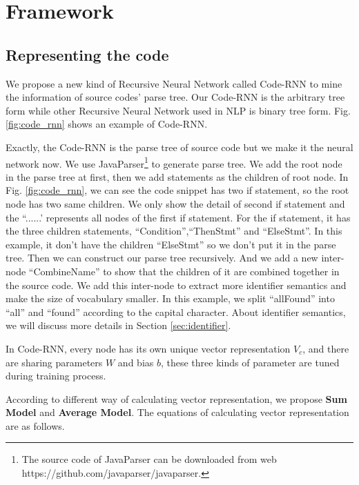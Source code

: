 \section{Framework}

\subsection{Representing the code}

We propose a new kind of Recursive Neural Network called Code-RNN to mine the information of source codes' parse tree. Our Code-RNN is the arbitrary tree form while other Recursive Neural Network used in NLP is binary tree form. Fig. \ref{fig:code_rnn} shows an example of Code-RNN.

Exactly, the Code-RNN is the parse tree of source code but we make it the neural network now. We use JavaParser\footnote{The source code of JavaParser can be downloaded from web https://github.com/javaparser/javaparser.} to generate parse tree. We add the root node in the parse tree at first, then we add statements as the children of root node. In Fig. \ref{fig:code_rnn}, we can see the code snippet has two if statement, so the root node has two same children. We only show the detail of second if statement and the ``......' represents all nodes of the first if statement. For the if statement, it has the three children statements, ``Condition'',``ThenStmt'' and ``ElseStmt''. In this example, it don't have the children ``ElseStmt'' so we don't put it in the parse tree. Then we can construct our parse tree recursively. And we add a new inter-node ``CombineName'' to show that the children of it are combined together in the source code. We add this inter-node to extract more identifier semantics and make the size of vocabulary smaller. In this example, we split ``allFound'' into ``all'' and ``found'' according to the capital character. About identifier semantics, we will discuss more details in Section \ref{sec:identifier}.

In Code-RNN, every node has its own unique vector representation $V_{c}$, and there are sharing parameters $W$ and bias $b$, these three kinds of parameter are tuned during training process.

According to different way of calculating vector representation, we propose \textbf{Sum Model} and \textbf{Average Model}. The equations of calculating vector representation are as follows.

